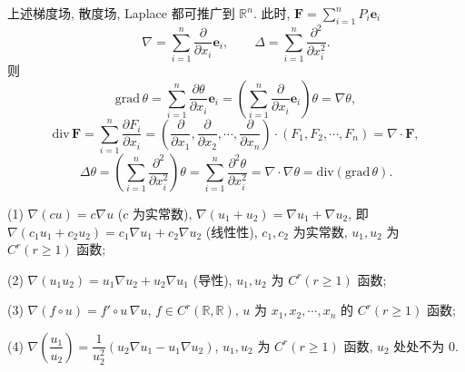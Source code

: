 \begin{definition}
上述梯度场, 散度场, Laplace 都可推广到 $\mathbb{R}^{n}$. 此时, $\boldsymbol{F}=\sum_{i=1}^{n}P_{i}\boldsymbol{e}_{i}$
\[
\nabla=\sum_{i=1}^{n}\frac{\partial}{\partial x_{i}}\boldsymbol{e}_{i},\qquad\Delta=\sum_{i=1}^{n}\frac{\partial^{2}}{\partial x_{i}^{2}}.
\]
则
\[
\mathrm{grad}\,\theta=\sum_{i=1}^{n}\frac{\partial\theta}{\partial x_{i}}\boldsymbol{e}_{i}=\left(\sum_{i=1}^{n}\frac{\partial}{\partial x_{i}}\boldsymbol{e}_{i}\right)\theta=\nabla\theta,
\]
\[
\mathrm{div}\,\boldsymbol{F}=\sum_{i=1}^{n}\frac{\partial F_{i}}{\partial x_{i}}=\left(\frac{\partial}{\partial x_{1}},\frac{\partial}{\partial x_{2}},\cdots,\frac{\partial}{\partial x_{n}}\right)\cdot(F_{1},F_{2},\cdots,F_{n})=\nabla\cdot\boldsymbol{F},
\]
\[
\Delta\theta=\left(\sum_{i=1}^{n}\frac{\partial^{2}}{\partial x_{i}^{2}}\right)\theta=\sum_{i=1}^{n}\frac{\partial^{2}\theta}{\partial x_{i}^{2}}=\nabla\cdot\nabla\theta=\mathrm{div}(\mathrm{grad}\,\theta).
\]
\end{definition}

\begin{lemma}\label{lem:11.6.1}
(1) $\nabla(cu)=c\nabla u$ ($c$ 为实常数), $\nabla(u_{1}+u_{2})=\nabla u_{1}+\nabla u_{2}$, 即 $\nabla(c_{1}u_{1}+c_{2}u_{2})=c_{1}\nabla u_{1}+c_{2}\nabla u_{2}$ (线性性), $c_{1},c_{2}$ 为实常数, $u_{1},u_{2}$ 为 $C^{r}(r\geqslant1)$ 函数;

(2) $\nabla(u_{1}u_{2})=u_{1}\nabla u_{2}+u_{2}\nabla u_{1}$ (导性), $u_{1},u_{2}$ 为 $C^{r}(r\geqslant1)$ 函数;

(3) $\nabla(f\circ u)=f'\circ u\,\nabla u$, $f\in C^{r}(\mathbb{R},\mathbb{R})$, $u$ 为 $x_{1},x_{2},\cdots,x_{n}$ 的 $C^{r}(r\geqslant1)$ 函数;

(4) $\nabla\left(\dfrac{u_{1}}{u_{2}}\right)=\dfrac{1}{u_{2}^{2}}(u_{2}\nabla u_{1}-u_{1}\nabla u_{2})$, $u_{1},u_{2}$ 为 $C^{r}(r\geqslant1)$ 函数, $u_{2}$ 处处不为 $0$.
\end{lemma}

